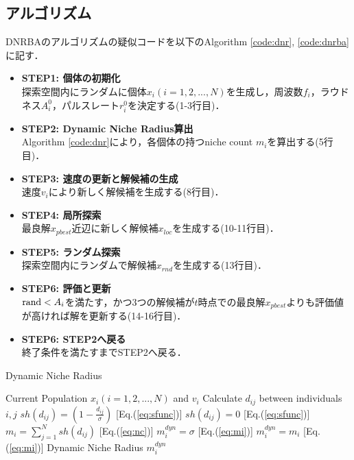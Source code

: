\documentclass[a4j,11pt]{jarticle}
\begin{document}
\subsection{アルゴリズム}
\label{sss:DNRBA-algorithm}
DNRBAのアルゴリズムの疑似コードを以下のAlgorithm \ref{code:dnr}, \ref{code:dnrba}に記す．

\begin{itemize}
\item {\bf STEP1: 個体の初期化}\\
探索空間内にランダムに個体$x_i (i=1,2,...,N)$を生成し，周波数$f_i$，ラウドネス$A_i^0$，パルスレート$r_i^0$を決定する(1-3行目)．
\item {\bf STEP2: Dynamic Niche Radius算出}\\
Algorithm \ref{code:dnr}により，各個体の持つniche count $m_i$を算出する(5行目)．
\item {\bf STEP3: 速度の更新と解候補の生成}\\
速度$v_i$により新しく解候補を生成する(8行目)．
\item {\bf STEP4: 局所探索}\\
最良解$x_{pbest}$近辺に新しく解候補$x_{loc}$を生成する(10-11行目)．
\item {\bf STEP5: ランダム探索}\\
探索空間内にランダムで解候補$x_{rnd}$を生成する(13行目)．
\item {\bf STEP6: 評価と更新}\\
${\rm rand} < A_i$を満たす，かつ3つの解候補が$t$時点での最良解$x_{pbest}$よりも評価値が高ければ解を更新する(14-16行目)．
\item {\bf STEP6: STEP2へ戻る}\\
終了条件を満たすまでSTEP2へ戻る．
\end{itemize}

\begin{algorithm}[h]
\caption{Dynamic Niche Radius}
\label{code:dnr}
\begin{algorithmic}[2]
\REQUIRE Current Population $x_i(i=1,2,..., N)$ and $v_i$
\STATE Calculate $d_{ij}$ between individuals $i,j$
\STATE $sh(d_{ij}) =  (1-\frac{d_{ij}}{\sigma})$ [Eq.(\ref{eq:sfunc})]
\ELSE
\STATE $sh(d_{ij}) =  0 $ [Eq.(\ref{eq:sfunc})]
\ENDIF
\ENDFOR
\STATE $m_i=\sum_{j=1}^N sh(d_{ij})$ [Eq.(\ref{eq:nc})]
\ENDFOR
{}
\STATE $m_i^{dyn}=\sigma$ [Eq.(\ref{eq:mi})]
\ELSE 
\STATE $m_i^{dyn} = m_i$ [Eq.(\ref{eq:mi})]
\ENDIF
\ENDFOR
\RETURN Dynamic Niche Radius $m_i^{dyn}$
\end{algorithmic}
\end{algorithm}
\end{document}
